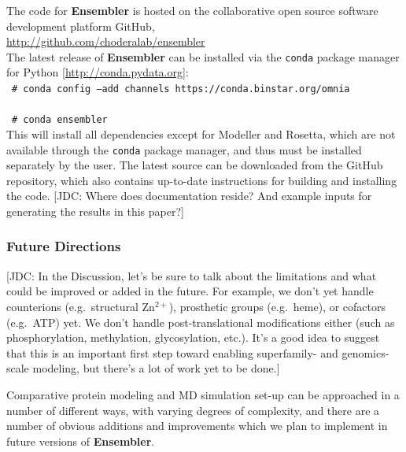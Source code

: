 \documentclass[aps,pre,twocolumn,nofootinbib,superscriptaddress,linenumbers]{revtex4-1}
\newcommand{\shellcmd}[1]{\\\ \texttt{\scriptsize\# #1}\\}
\begin{document}
The code for {\bf Ensembler} is hosted on the collaborative open source software development platform GitHub,\\
\url{http://github.com/choderalab/ensembler} \\
The latest release of {\bf Ensembler} can be installed via the {\tt conda} package manager for Python [\url{http://conda.pydata.org}]:
\shellcmd{conda config --add channels https://conda.binstar.org/omnia}
\shellcmd{conda ensembler}
This will install all dependencies except for Modeller and Rosetta, which are not available through the {\tt conda} package manager, and thus must be installed separately by the user.
The latest source can be downloaded from the GitHub repository, which also contains up-to-date instructions for building and installing the code.
{\color{red}[JDC: Where does documentation reside?  And example inputs for generating the results in this paper?]}

\subsubsection*{Future Directions}

{\color{red}[JDC: In the Discussion, let's be sure to talk about the limitations and what could be improved or added in the future.  For example, we don't yet handle counterions (e.g.~structural Zn$^{2+}$), prosthetic groups (e.g.~heme), or cofactors (e.g.~ATP) yet.  We don't handle post-translational modifications either (such as phosphorylation, methylation, glycosylation, etc.).  It's a good idea to suggest that this is an important first step toward enabling superfamily- and genomics-scale modeling, but there's a lot of work yet to be done.]}

Comparative protein modeling and MD simulation set-up can be approached in a number of different ways, with varying degrees of complexity, and there are a number of obvious additions and improvements which we plan to implement in future versions of {\bf Ensembler}.
\end{document}
